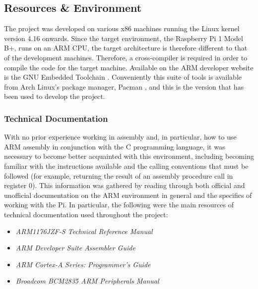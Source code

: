 \subsection{Resources \& Environment}
    The project was developed on various x86 machines running the Linux kernel
    version 4.16 onwards. Since the target environment, the Raspberry Pi 1 Model
    B+, runs on an ARM CPU, the target architecture is therefore different to
    that of the development machines. Therefore, a cross-compiler is required in
    order to compile the code for the target machine. Available on the ARM
    developer website is the GNU Embedded Toolchain \cite{GNUToolchain}.
    Conveniently this suite of tools is available from Arch Linux's package
    manager, Pacman \cite{PacmanEABI}, and this is the version that has been
    used to develop the project.

    \subsubsection{Technical Documentation}
        With no prior experience working in assembly and, in particular, how to
        use ARM assembly in conjunction with the C programming language, it was
        necessary to become better acquainted with this environment, including
        becoming familiar with the instructions available and the calling
        conventions that must be followed (for example, returning the result of
        an assembly procedure call in register 0). This information was gathered
        by reading through both official and unofficial documentation on the ARM
        environment in general and the specifics of working with the Pi. In
        particular, the following were the main resources of technical
        documentation used throughout the project:
        \begin{itemize}
            \itemsep0em 
            \item \textit{ARM1176JZF-S Technical Reference Manual} \cite{TRM}
            \item \textit{ARM Developer Suite Assembler Guide}
                \cite{OnlineARMGuide}
            \item \textit{ARM Cortex-A Series: Programmer's Guide}
                \cite{ProgrammersGuide}
            \item \textit{Broadcom BCM2835 ARM Peripherals Manual} \cite{BCM2835}
        \end{itemize}

